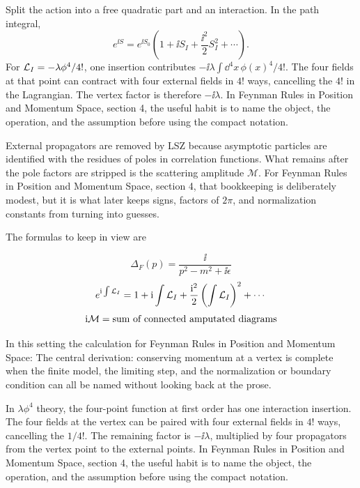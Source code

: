 Split the action into a free quadratic part and an interaction.  In the path integral,
\[
  e^{\ii S}=e^{\ii S_0}\left(1+\ii S_I+\frac{\ii^2}{2}S_I^2+\cdots\right).
\]
For \(\mathcal L_I=-\lambda\phi^4/4!\), one insertion contributes \(-\ii\lambda\int\dd^4x\,\phi(x)^4/4!\).  The four fields at that point can contract with four external fields in \(4!\) ways, cancelling the \(4!\) in the Lagrangian.  The vertex factor is therefore \(-\ii\lambda\).  In Feynman Rules in Position and Momentum Space, section 4, the useful habit is to name the object, the operation, and the assumption before using the compact notation.

External propagators are removed by LSZ because asymptotic particles are identified with the residues of poles in correlation functions.  What remains after the pole factors are stripped is the scattering amplitude \(\mathcal M\).  For Feynman Rules in Position and Momentum Space, section 4, that bookkeeping is deliberately modest, but it is what later keeps signs, factors of \(2\pi\), and normalization constants from turning into guesses.

The formulas to keep in view are

\[
  \Delta_F(p)=\frac{\ii}{p^2-m^2+\ii\epsilon}
\]
\[
  e^{\mathrm i\int\mathcal L_I}=1+\mathrm i\int\mathcal L_I+\frac{\mathrm i^2}{2}\left(\int\mathcal L_I\right)^2+\cdots
\]
\[
  \mathrm i\mathcal M=\hbox{sum of connected amputated diagrams}
\]

In this setting the calculation for Feynman Rules in Position and Momentum Space: The central derivation: conserving momentum at a vertex is complete when the finite model, the limiting step, and the normalization or boundary condition can all be named without looking back at the prose.




\begin{example}
In \(\lambda\phi^4\) theory, the four-point function at first order has one interaction insertion.  The four fields at the vertex can be paired with four external fields in \(4!\) ways, cancelling the \(1/4!\).  The remaining factor is \(-\ii\lambda\), multiplied by four propagators from the vertex point to the external points.  In Feynman Rules in Position and Momentum Space, section 4, the useful habit is to name the object, the operation, and the assumption before using the compact notation.
\end{example}



